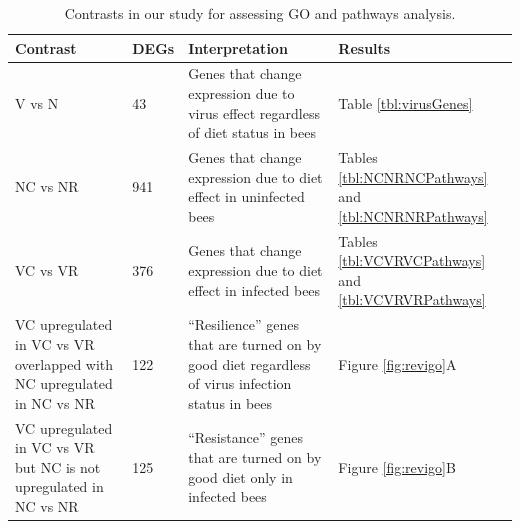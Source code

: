 \documentclass[11pt,a4paper,oldfontcommands,openany]{memoir}
\numberwithin{equation}{section} %
\begin{document}
\begin{table}[H]
\begin{tabular}{ | m{5cm} | m{0.9cm}| m{5.5cm} | m{2cm} | } 
\hline
Contrast & DEGs & Interpretation & Results \\ 
\hline
V vs N & 43 & Genes that change expression due to virus effect regardless of diet status in bees & Table \ref{tbl:virusGenes} \\ 
\hline
NC vs NR & 941 & Genes that change expression due to diet effect in uninfected bees & Tables \ref{tbl:NCNRNCPathways} and \ref{tbl:NCNRNRPathways} \\ 
\hline
VC vs VR & 376 & Genes that change expression due to diet effect in infected bees & Tables \ref{tbl:VCVRVCPathways} and \ref{tbl:VCVRVRPathways} \\ 
\hline
VC upregulated in VC vs VR overlapped with NC upregulated in NC vs NR & 122 & ``Resilience'' genes that are turned on by good diet regardless of virus infection status in bees & Figure \ref{fig:revigo}A \\
\hline
VC upregulated in VC vs VR but NC is not upregulated in NC vs NR & 125 & ``Resistance'' genes that are turned on by good diet only in infected bees & Figure \ref{fig:revigo}B \\
\hline
\end{tabular}
\caption{Contrasts in our study for assessing GO and pathways analysis.}
  \label{tbl:contrasts}
\end{table}



\end{document}
